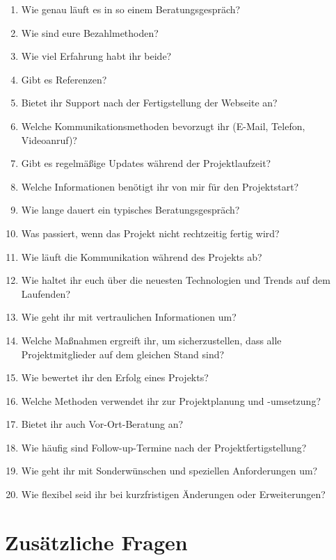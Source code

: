 \documentclass[a4paper,12pt]{article}
\begin{document}
\begin{enumerate}[resume]
    \item Wie genau läuft es in so einem Beratungsgespräch?
    \item Wie sind eure Bezahlmethoden?
    \item Wie viel Erfahrung habt ihr beide?
    \item Gibt es Referenzen?
    \item Bietet ihr Support nach der Fertigstellung der Webseite an?
    \item Welche Kommunikationsmethoden bevorzugt ihr (E-Mail, Telefon, Videoanruf)?
    \item Gibt es regelmäßige Updates während der Projektlaufzeit?
    \item Welche Informationen benötigt ihr von mir für den Projektstart?
    \item Wie lange dauert ein typisches Beratungsgespräch?
    \item Was passiert, wenn das Projekt nicht rechtzeitig fertig wird?
    \item Wie läuft die Kommunikation während des Projekts ab?
    \item Wie haltet ihr euch über die neuesten Technologien und Trends auf dem Laufenden?
    \item Wie geht ihr mit vertraulichen Informationen um?
    \item Welche Maßnahmen ergreift ihr, um sicherzustellen, dass alle Projektmitglieder auf dem gleichen Stand sind?
    \item Wie bewertet ihr den Erfolg eines Projekts?
    \item Welche Methoden verwendet ihr zur Projektplanung und -umsetzung?
    \item Bietet ihr auch Vor-Ort-Beratung an?
    \item Wie häufig sind Follow-up-Termine nach der Projektfertigstellung?
    \item Wie geht ihr mit Sonderwünschen und speziellen Anforderungen um?
    \item Wie flexibel seid ihr bei kurzfristigen Änderungen oder Erweiterungen?
\end{enumerate}

\section*{Zusätzliche Fragen}
\end{document}
